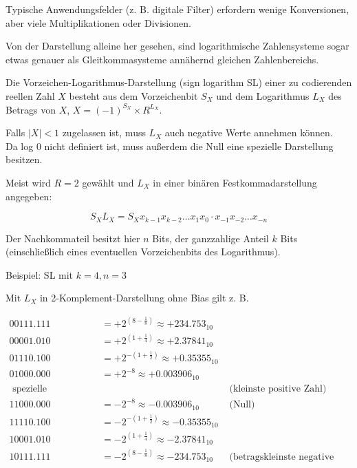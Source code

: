 \documentclass[10pt]{article}
\begin{document}
Typische Anwendungsfelder (z. B. digitale Filter) erfordern wenige Konversionen, aber viele Multiplikationen oder Divisionen.

Von der Darstellung alleine her gesehen, sind logarithmische Zahlensysteme sogar etwas genauer als Gleitkommasysteme annähernd gleichen Zahlenbereichs.

Die Vorzeichen-Logarithmus-Darstellung (sign logarithm SL) einer zu codierenden reellen Zahl $X$ besteht aus dem Vorzeichenbit $S_{X}$ und dem Logarithmus $L_{X}$ des Betrags von $X$, $X=(-1)^{S_{X}} \times R^{L_{X}}$.

Falls $|X|<1$ zugelassen ist, muss $L_{X}$ auch negative Werte annehmen können.\\
Da log 0 nicht definiert ist, muss außerdem die Null eine spezielle Darstellung besitzen.

Meist wird $R=2$ gewählt und $L_{X}$ in einer binären Festkommadarstellung angegeben:

$$
S_{X} L_{X}=S_{X} x_{k-1} x_{k-2} \ldots x_{1} x_{0} \cdot x_{-1} x_{-2} \ldots x_{-n}
$$

Der Nachkommateil besitzt hier $n$ Bits, der ganzzahlige Anteil $k$ Bits (einschließlich eines eventuellen Vorzeichenbits des Logarithmus).

Beispiel: SL mit $k=4, n=3$

Mit $L_{X}$ in 2-Komplement-Darstellung ohne Bias gilt z. B.

$$
\begin{array}{rll}
00111.111 & =+2^{\left(8-\frac{1}{8}\right)} \approx+234.753_{10} & \\
00001.010 & =+2^{\left(1+\frac{1}{4}\right)} \approx+2.37841_{10} \\
01110.100 & =+2^{-\left(1+\frac{1}{2}\right)} \approx+0.35355_{10} \\
01000.000 & =+2^{-8} \approx+0.003906_{10} & \\
\text { spezielle Darstellung } & & \text { (kleinste positive Zahl) } \\
11000.000 & =-2^{-8} \approx-0.003906_{10} & \text { (Null) } \\
11110.100 & =-2^{-\left(1+\frac{1}{2}\right)} \approx-0.35355_{10} & \\
10001.010 & =-2^{\left(1+\frac{1}{4}\right)} \approx-2.37841_{10} & \\
10111.111 & =-2^{\left(8-\frac{1}{8}\right)} \approx-234.753_{10} & \text { (betragskleinste negative Zahl) }
\end{array}
$$
\end{document}
